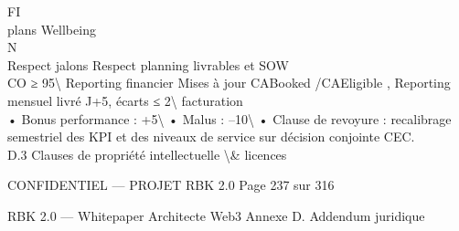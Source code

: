 \vspace{0.5em}
\vspace{0.5em}
\vspace{0.5em}
\vspace{0.5em}
FI\\
plans Wellbeing\\
\vspace{0.5em}
\vspace{0.5em}
\vspace{0.5em}
N\\
Respect jalons                Respect planning livrables et SOW\\
CO                            ≥ 95\textbackslash{}%
Reporting financier           Mises à jour CABooked /CAEligible ,    Reporting mensuel livré J+5, écarts ≤ 2\textbackslash{}%
facturation\\
\vspace{0.5em}
\vspace{0.5em}
• Bonus performance : +5\textbackslash{}%
\vspace{0.5em}
• Malus : –10\textbackslash{}%
\vspace{0.5em}
• Clause de revoyure : recalibrage semestriel des KPI et des niveaux de service sur décision conjointe CEC.\\
\vspace{0.5em}
\vspace{0.5em}
\vspace{0.5em}
D.3 Clauses de propriété intellectuelle \textbackslash{}& licences\\
\vspace{0.5em}
\vspace{0.5em}
\vspace{0.5em}
\begin{confidential}CONFIDENTIEL — PROJET RBK 2.0                                              Page 237 sur 316\end{confidential}
RBK 2.0 — Whitepaper Architecte Web3                                                                                                  Annexe D. Addendum juridique\\
